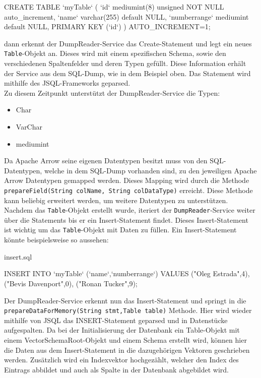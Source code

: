 \begin{terminalblock}
  \begin{textcode}
CREATE TABLE `myTable` (
  `id` mediumint(8) unsigned NOT NULL auto_increment,
  `name` varchar(255) default NULL,
  `numberrange` mediumint default NULL,
  PRIMARY KEY (`id`)
) AUTO_INCREMENT=1;
  \end{textcode}
\end{terminalblock}

dann erkennt der DumpReader-Service das Create-Statement und legt ein neues \texttt{Table}-Objekt an. Dieses wird mit einem spezifischen Schema, sowie den verschiedenen Spaltenfelder und deren Typen gefüllt.
Diese Information erhält der Service aus dem SQL-Dump, wie in dem Beispiel oben.
Das Statement wird mithilfe des JSQL-Frameworks geparsed. \\

Zu diesem Zeitpunkt unterstützt der DumpReader-Service die Typen:

\begin{itemize}
 \item Char
 \item VarChar
 \item mediumint
\end{itemize}

Da Apache Arrow seine eigenen Datentypen besitzt muss von den SQL-Datentypen, welche in dem SQL-Dump vorhanden sind, zu den jeweiligen Apache Arrow Datentypen gemapped werden. 
Dieses Mapping wird durch die Methode \texttt{prepareField(String colName, String colDataType)} erreicht.
Diese Methode kann beliebig erweitert werden, um weitere Datentypen zu unterstützen.\\
Nachdem das \texttt{Table}-Objekt erstellt wurde, iteriert der \texttt{DumpReader}-Service weiter über die Statements bis er ein Insert-Statement findet. Dieses Insert-Statement ist wichtig um das \texttt{Table}-Objekt mit Daten zu füllen.
Ein Insert-Statement könnte beispielsweise so aussehen:\\

\begin{terminalblock}{insert.sql}
  \begin{textcode}
INSERT INTO `myTable` (`name`,`numberrange`)
VALUES
  ("Oleg Estrada",4),
  ("Bevis Davenport",0),
  ("Ronan Tucker",9);
  \end{textcode}
\end{terminalblock}

Der DumpReader-Service erkennt nun das Insert-Statement und springt in die \texttt{prepareDataForMemory(String stmt,Table table)} Methode. Hier wird wieder mithilfe von JSQL das INSERT-Statement geparsed und in Datenstücke aufgespalten.
Da bei der Initialisierung der Datenbank ein Table-Objekt mit einem VectorSchemaRoot-Objekt und einem Schema erstellt wird, können hier die Daten aus dem Insert-Statement in die dazugehörigen Vektoren geschrieben werden.
Zusätzlich wird ein Indexvektor hochgezählt, welcher den Index des Eintrags abbildet und auch als Spalte in der Datenbank abgebildet wird.\\\\

